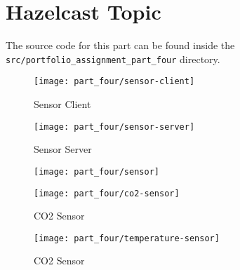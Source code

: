 \section{Hazelcast Topic}
The source code for this part can be found inside the
\small\texttt{src/portfolio\_assignment\_part\_four}
\normalsize directory.

\begin{figure}
\caption{Sensor Client}
\centering
\texttt{[image: part\_four/sensor-client]}
\end{figure}

\begin{figure}
\caption{Sensor Server}
\centering
\texttt{[image: part\_four/sensor-server]}
\end{figure}

\caption{Sensor}
\begin{figure}
\centering
\texttt{[image: part\_four/sensor]}
\end{figure}

\begin{figure}
\caption{CO2 Sensor}
\centering
\texttt{[image: part\_four/co2-sensor]}
\end{figure}

\begin{figure}
\caption{CO2 Sensor}
\centering
\texttt{[image: part\_four/temperature-sensor]}
\end{figure}
